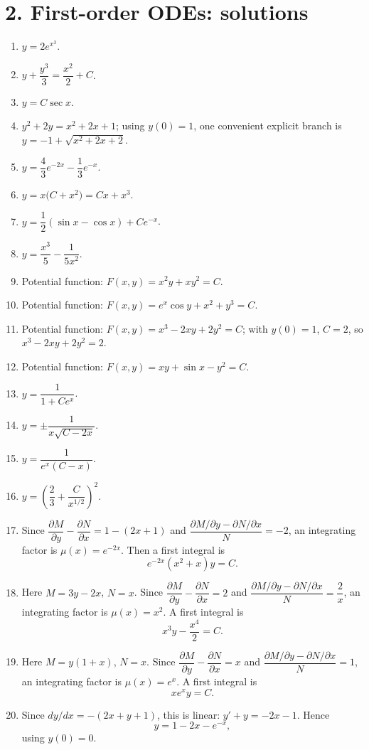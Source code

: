 \documentclass[11pt,a4paper]{article}
\begin{document}
\section*{2. First-order ODEs: solutions}
\begin{enumerate}
    \item $y=2e^{x^3}$.
    \item $y+\dfrac{y^3}{3}=\dfrac{x^2}{2}+C$.
    \item $y=C\sec x$.
    \item $y^2+2y=x^2+2x+1$; using $y(0)=1$, one convenient explicit branch is $y=-1+\sqrt{x^2+2x+2}$.
    \item $y=\dfrac{4}{3}e^{-2x}-\dfrac{1}{3}e^{-x}$.
    \item $y=x\bigl(C+x^2\bigr)=Cx+x^3$.
    \item $y=\dfrac{1}{2}(\sin x-\cos x)+Ce^{-x}$.
    \item $y=\dfrac{x^3}{5}-\dfrac{1}{5x^2}$.
    \item Potential function: $F(x,y)=x^2y+xy^2=C$.
    \item Potential function: $F(x,y)=e^x\cos y+x^2+y^3=C$.
    \item Potential function: $F(x,y)=x^3-2xy+2y^2=C$; with $y(0)=1$, $C=2$, so $x^3-2xy+2y^2=2$.
    \item Potential function: $F(x,y)=xy+\sin x-y^2=C$.
    \item $y=\dfrac{1}{1+Ce^x}$.
    \item $y=\pm\dfrac{1}{x\sqrt{C-2x}}$.
    \item $y=\dfrac{1}{e^x(C-x)}$.
    \item $y=\left(\dfrac{2}{3}+\dfrac{C}{x^{1/2}}\right)^2$.
    \item Since $\dfrac{\partial M}{\partial y}-\dfrac{\partial N}{\partial x}=1-(2x+1)$ and $\dfrac{\partial M/\partial y-\partial N/\partial x}{N}=-2$, an integrating factor is $\mu(x)=e^{-2x}$. Then a first integral is
    \[
        e^{-2x}(x^2+x)y=C.
    \]
    \item Here $M=3y-2x$, $N=x$. Since $\dfrac{\partial M}{\partial y}-\dfrac{\partial N}{\partial x}=2$ and $\dfrac{\partial M/\partial y-\partial N/\partial x}{N}=\dfrac{2}{x}$, an integrating factor is $\mu(x)=x^2$. A first integral is
    \[
        x^3y-\frac{x^4}{2}=C.
    \]
    \item Here $M=y(1+x)$, $N=x$. Since $\dfrac{\partial M}{\partial y}-\dfrac{\partial N}{\partial x}=x$ and $\dfrac{\partial M/\partial y-\partial N/\partial x}{N}=1$, an integrating factor is $\mu(x)=e^x$. A first integral is
    \[
        x e^x y=C.
    \]
    \item Since $dy/dx=-(2x+y+1)$, this is linear: $y'+y=-2x-1$. Hence
    \[
        y=1-2x-e^{-x},
    \]
    using $y(0)=0$.
\end{enumerate}
\end{document}
